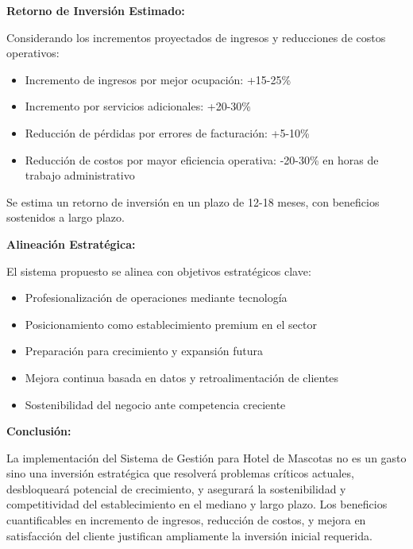 	\textbf{Retorno de Inversión Estimado:}
	
	Considerando los incrementos proyectados de ingresos y reducciones de costos operativos:
	
	\begin{itemize}
		\item Incremento de ingresos por mejor ocupación: +15-25\%
		\item Incremento por servicios adicionales: +20-30\%
		\item Reducción de pérdidas por errores de facturación: +5-10\%
		\item Reducción de costos por mayor eficiencia operativa: -20-30\% en horas de trabajo administrativo
	\end{itemize}
	
	Se estima un retorno de inversión en un plazo de 12-18 meses, con beneficios sostenidos a largo plazo.
	
	\textbf{Alineación Estratégica:}
	
	El sistema propuesto se alinea con objetivos estratégicos clave:
	
	\begin{itemize}
		\item Profesionalización de operaciones mediante tecnología
		\item Posicionamiento como establecimiento premium en el sector
		\item Preparación para crecimiento y expansión futura
		\item Mejora continua basada en datos y retroalimentación de clientes
		\item Sostenibilidad del negocio ante competencia creciente
	\end{itemize}
	
	\textbf{Conclusión:}
	
	La implementación del Sistema de Gestión para Hotel de Mascotas no es un gasto sino una inversión estratégica que resolverá problemas críticos actuales, desbloqueará potencial de crecimiento, y asegurará la sostenibilidad y competitividad del establecimiento en el mediano y largo plazo. Los beneficios cuantificables en incremento de ingresos, reducción de costos, y mejora en satisfacción del cliente justifican ampliamente la inversión inicial requerida.
